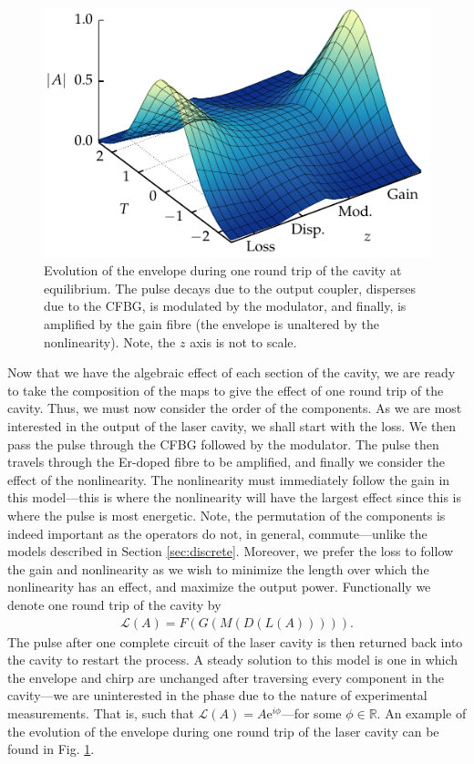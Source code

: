 \documentclass[9pt,twocolumn,twoside]{osajnl}
\begin{document}
\begin{figure}[tbp]
	\centering
	\includegraphics{Figures/Evo}
	\caption{Evolution of the envelope during one round trip of the cavity at equilibrium. The pulse decays due to the output coupler, disperses due to the CFBG, is modulated by the modulator, and finally, is amplified by the gain fibre (the envelope is unaltered by the nonlinearity). Note, the $z$ axis is not to scale.}
	\label{fig:cavityevo}
\end{figure}

Now that we have the algebraic effect of each section of the cavity, we are ready to take the composition of the maps to give the effect of one round trip of the cavity. Thus, we must now consider the order of the components. As we are most interested in the output of the laser cavity, we shall start with the loss. We then pass the pulse through the CFBG followed by the modulator. The pulse then travels through the Er-doped fibre to be amplified, and finally we consider the effect of the nonlinearity. The nonlinearity must immediately follow the gain in this model---this is where the nonlinearity will have the largest effect since this is where the pulse is most energetic. Note, the permutation of the components is indeed important as the operators do not, in general, commute---unlike the models described in Section \ref{sec:discrete}. Moreover, we prefer the loss to follow the gain and nonlinearity as we wish to minimize the length over which the nonlinearity has an effect, and maximize the output power. Functionally we denote one round trip of the cavity by
\begin{align}
	\mathcal{L}(A) = F(G(M(D(L(A))))).
	\label{eq:order}
\end{align}
 The pulse after one complete circuit of the laser cavity is then returned back into the cavity to restart the process. A steady solution to this model is one in which the envelope and chirp are unchanged after traversing every component in the cavity---we are uninterested in the phase due to the nature of experimental measurements. That is, such that $\mathcal{L}(A) = A \textrm{e}^{i \phi}$---for some $\phi \in \mathbb{R}$. An example of the evolution of the envelope during one round trip of the laser cavity can be found in Fig. \ref{fig:cavityevo}.
\end{document}

